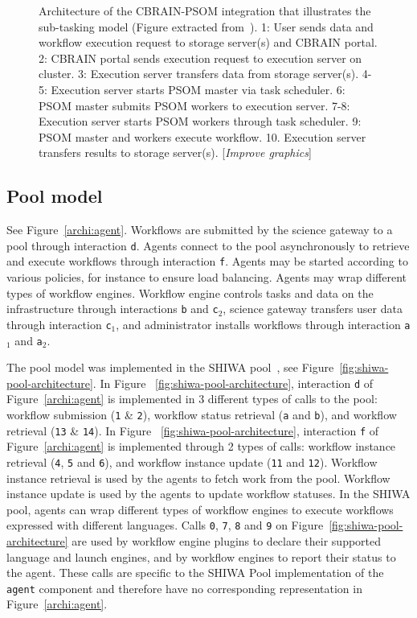 \documentclass[preprint,3p,twocolumn]{elsarticle}
\newcommand{\todo}[1]{\color{blue}\xspace[\emph{#1}]\xspace\color{black}}
\begin{document}
\begin{figure}
\def\svgwidth{\columnwidth}

\caption{Architecture of the CBRAIN-PSOM integration that illustrates
  the sub-tasking model (Figure extracted from~\cite{GLAT-16}). 1:
  User sends data and workflow execution request to storage server(s)
  and CBRAIN portal. 2: CBRAIN portal sends execution request to
  execution server on cluster. 3: Execution server transfers data from
  storage server(s). 4-5: Execution server starts PSOM master via task
  scheduler. 6: PSOM master submits PSOM workers to execution
  server. 7-8: Execution server starts PSOM workers through task
  scheduler. 9: PSOM master and workers execute workflow. 10.
  Execution server transfers results to storage server(s). \todo{Improve graphics}}
\label{fig:cbrain-psom-architecture}
\end{figure}


\subsection{Pool model}
\label{sec:pool}
See Figure~\ref{archi:agent}. Workflows are submitted by the science
gateway to a pool through interaction \texttt{d}. Agents connect to
the pool asynchronously to retrieve and execute workflows through
interaction \texttt{f}. Agents may be started according to various
policies, for instance to ensure load balancing. Agents may wrap
different types of workflow engines. Workflow engine controls tasks
and data on the infrastructure through interactions \texttt{b} and
\texttt{c$_2$}, science gateway transfers user data through
interaction \texttt{c$_1$}, and administrator installs workflows
through interaction \texttt{a$_1$} and \texttt{a$_2$}.

The pool model was implemented in the SHIWA pool~\cite{ROGE-13}, see
Figure~\ref{fig:shiwa-pool-architecture}. In Figure
~\ref{fig:shiwa-pool-architecture}, interaction \texttt{d} of
Figure~\ref{archi:agent} is implemented in 3 different types of calls
to the pool: workflow submission (\texttt{1} \& \texttt{2}), workflow
status retrieval (\texttt{a} and \texttt{b}), and workflow retrieval
(\texttt{13} \& \texttt{14}). In Figure
~\ref{fig:shiwa-pool-architecture}, interaction \texttt{f} of
Figure~\ref{archi:agent} is implemented through 2 types of calls:
workflow instance retrieval (\texttt{4}, \texttt{5} and \texttt{6}),
and workflow instance update (\texttt{11} and \texttt{12}). Workflow
instance retrieval is used by the agents to fetch work from the
pool. Workflow instance update is used by the agents to update
workflow statuses. In the SHIWA pool, agents can wrap different types
of workflow engines to execute workflows expressed with different
languages. Calls \texttt{0}, \texttt{7}, \texttt{8} and \texttt{9} on
Figure~\ref{fig:shiwa-pool-architecture} are used by workflow engine
plugins to declare their supported language and launch engines, and by
workflow engines to report their status to the agent. These calls are
specific to the SHIWA Pool implementation of the \texttt{agent}
component and therefore have no corresponding representation in
Figure~\ref{archi:agent}.
\end{document}
